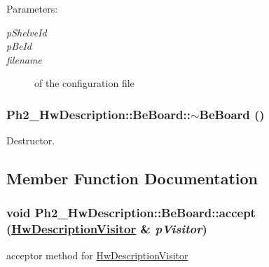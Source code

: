 \begin{Desc}
\item[Parameters:]
\begin{description}
\item[{\em p\-Shelve\-Id}]\item[{\em p\-Be\-Id}]\item[{\em filename}]of the configuration file \end{description}
\end{Desc}
\hypertarget{class_ph2___hw_description_1_1_be_board_9e763718213e7106b7a6ba1ccb5d23e2}{
\subsubsection[$\sim$BeBoard]{\setlength{\rightskip}{0pt plus 5cm}Ph2\_\-Hw\-Description::Be\-Board::$\sim$Be\-Board ()}}
\label{class_ph2___hw_description_1_1_be_board_9e763718213e7106b7a6ba1ccb5d23e2}


Destructor. 



\subsection{Member Function Documentation}
\hypertarget{class_ph2___hw_description_1_1_be_board_ccc84350bce4a95a2ce27bde0b146422}{
\subsubsection[accept]{\setlength{\rightskip}{0pt plus 5cm}void Ph2\_\-Hw\-Description::Be\-Board::accept (\hyperlink{class_hw_description_visitor}{Hw\-Description\-Visitor} \& {\em p\-Visitor})}}
\label{class_ph2___hw_description_1_1_be_board_ccc84350bce4a95a2ce27bde0b146422}


acceptor method for \hyperlink{class_hw_description_visitor}{Hw\-Description\-Visitor} 

